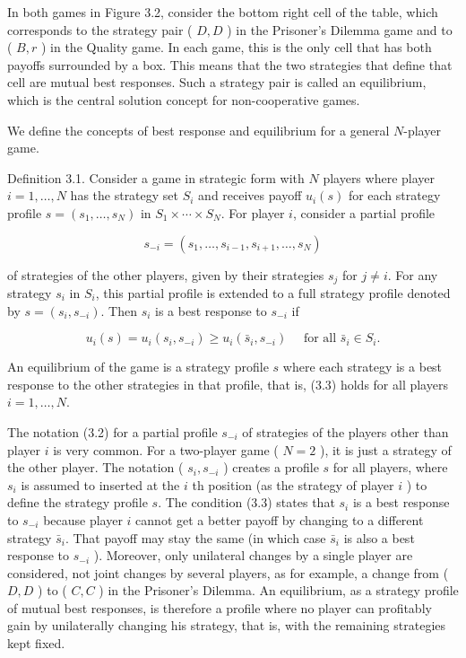 \documentclass[12pt]{article}
\begin{document}
In both games in Figure 3.2, consider the bottom right cell of the table, which corresponds to the strategy pair ( $D, D$ ) in the Prisoner's Dilemma game and to ( $B, r$ ) in the Quality game. In each game, this is the only cell that has both payoffs surrounded by a box. This means that the two strategies that define that cell are mutual best responses. Such a strategy pair is called an equilibrium, which is the central solution concept for non-cooperative games.

We define the concepts of best response and equilibrium for a general $N$-player game.

Definition 3.1. Consider a game in strategic form with $N$ players where player $i=1, \ldots, N$ has the strategy set $S_{i}$ and receives payoff $u_{i}(s)$ for each strategy profile $s=\left(s_{1}, \ldots, s_{N}\right)$ in $S_{1} \times \cdots \times S_{N}$. For player $i$, consider a partial profile


\begin{equation*}
s_{-i}=\left(s_{1}, \ldots, s_{i-1}, s_{i+1}, \ldots, s_{N}\right) \tag{3.2}
\end{equation*}


of strategies of the other players, given by their strategies $s_{j}$ for $j \neq i$. For any strategy $s_{i}$ in $S_{i}$, this partial profile is extended to a full strategy profile denoted by $s=\left(s_{i}, s_{-i}\right)$. Then $s_{i}$ is a best response to $s_{-i}$ if


\begin{equation*}
u_{i}(s)=u_{i}\left(s_{i}, s_{-i}\right) \geq u_{i}\left(\bar{s}_{i}, s_{-i}\right) \quad \text { for all } \bar{s}_{i} \in S_{i} . \tag{3.3}
\end{equation*}


An equilibrium of the game is a strategy profile $s$ where each strategy is a best response to the other strategies in that profile, that is, (3.3) holds for all players $i=1, \ldots, N$.

The notation (3.2) for a partial profile $s_{-i}$ of strategies of the players other than player $i$ is very common. For a two-player game ( $N=2$ ), it is just a strategy of the other player. The notation ( $s_{i}, s_{-i}$ ) creates a profile $s$ for all players, where $s_{i}$ is assumed to inserted at the $i$ th position (as the strategy of player $i$ ) to define the strategy profile $s$. The condition (3.3) states that $s_{i}$ is a best response to $s_{-i}$ because player $i$ cannot get a better payoff by changing to a different strategy $\bar{s}_{i}$. That payoff may stay the same (in which case $\bar{s}_{i}$ is also a best response to $s_{-i}$ ). Moreover, only unilateral changes by a single player are considered, not joint changes by several players, as for example, a change from ( $D, D$ ) to ( $C, C$ ) in the Prisoner's Dilemma. An equilibrium, as a strategy profile of mutual best responses, is therefore a profile where no player can profitably gain by unilaterally changing his strategy, that is, with the remaining strategies kept fixed.
\end{document}
